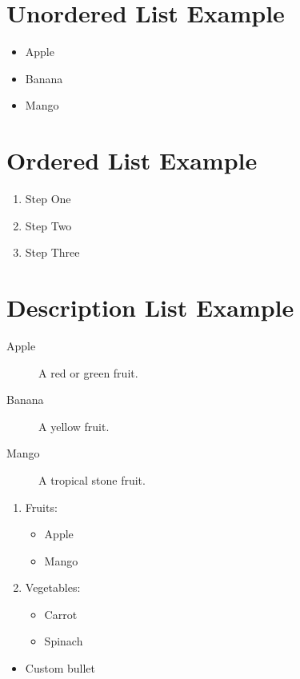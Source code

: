 \documentclass{article}
\begin{document}
\section*{Unordered List Example}
\begin{itemize}
  \item Apple
  \item Banana
  \item Mango
\end{itemize}

\section*{Ordered List Example}
\begin{enumerate}
  \item Step One
  \item Step Two
  \item Step Three
\end{enumerate}

\section*{Description List Example}
\begin{description}
  \item[Apple] A red or green fruit.
  \item[Banana] A yellow fruit.
  \item[Mango] A tropical stone fruit.
\end{description}

\begin{enumerate}
  \item Fruits:
    \begin{itemize}
      \item Apple
      \item Mango
    \end{itemize}
  \item Vegetables:
    \begin{itemize}
      \item Carrot
      \item Spinach
    \end{itemize}
\end{enumerate}
\begin{itemize}[label=**]
\item Custom bullet
\end{itemize}
\end{document}
